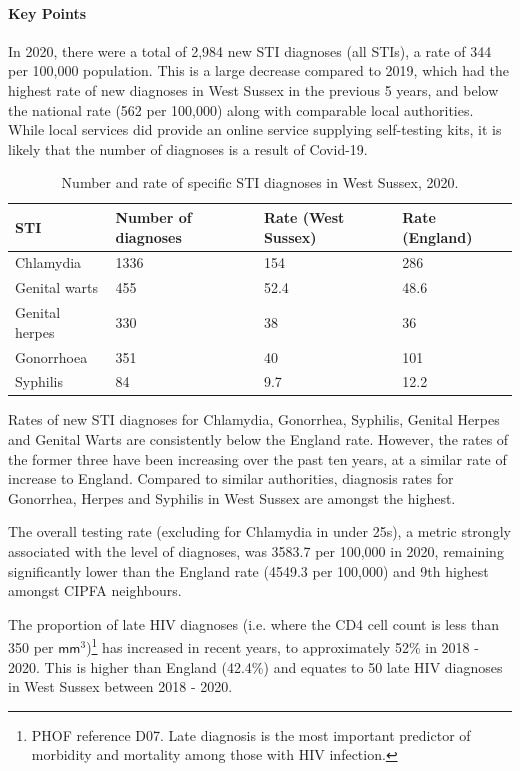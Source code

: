 
\paragraph{Key Points} In 2020, there were a total of 2,984 new STI diagnoses (all STIs), a rate of 344 per 100,000 population. This is a large decrease compared to 2019, which had the highest rate of new diagnoses in West Sussex in the previous 5 years, and below the national rate (562 per 100,000) along with comparable local authorities. While local services did provide an online service supplying self-testing kits, it is likely that the number of diagnoses is a result of Covid-19. 

\begin{table}
    \caption{Number and rate of specific STI diagnoses in West Sussex, 2020.}
    \centering
    \begin{tabular}{llll}
    \toprule
    STI & Number of diagnoses & Rate (West Sussex) & Rate (England) \\
    \midrule
    Chlamydia & 1336 & 154 & 286 \\
    Genital warts & 455 & 52.4 & 48.6 \\
    Genital herpes & 330 & 38 & 36 \\
    Gonorrhoea & 351 & 40 & 101 \\
    Syphilis & 84 & 9.7 & 12.2 \\
    \bottomrule
    \end{tabular}
    \label{tab:wa:stis}
\end{table}

Rates of new STI diagnoses for Chlamydia, Gonorrhea, Syphilis, Genital Herpes and Genital Warts are consistently below the England rate. However, the rates of the former three have been increasing over the past ten years, at a similar rate of increase to England. Compared to similar authorities, diagnosis rates for Gonorrhea, Herpes and Syphilis in West Sussex are amongst the highest.

The overall testing rate (excluding for Chlamydia in under 25s), a metric strongly associated with the level of diagnoses, was 3583.7 per 100,000 in 2020, remaining significantly lower than the England rate (4549.3 per 100,000) and 9th highest amongst CIPFA neighbours.

The proportion of late HIV diagnoses (i.e. where the CD4 cell count is less than 350 per $\mathsf{mm}^3$)\footnote{PHOF reference D07. Late diagnosis is the most important predictor of morbidity and mortality among those with HIV infection.} has increased in recent years, to approximately 52\% in 2018 - 2020. This is higher than England (42.4\%) and equates to 50 late HIV diagnoses in West Sussex between 2018 - 2020.

